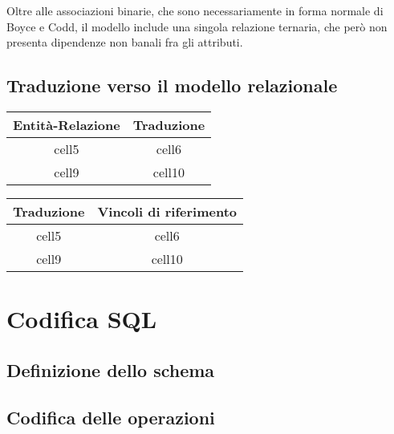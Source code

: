 \documentclass{article}
\newcommand{\sqlinputlisting}[2]{
	
}
\newcommand{\sql}[1]{
	\sqlinputlisting{../src/#1.sql}
	{\texttt{#1.sql}}
}
\begin{document}
Oltre alle associazioni binarie, che sono necessariamente in forma normale di
Boyce e Codd, il modello include una singola relazione ternaria, che però non
presenta dipendenze non banali fra gli attributi.

\subsection{Traduzione verso il modello relazionale}

\begin{center}\begin{tabular}{ |c|c| }
		\hline
		\textbf{Entità-Relazione} & \textbf{Traduzione} \\
		\hline
		cell5                     & cell6               \\
		\hline
		cell9                     & cell10              \\
		\hline
	\end{tabular}\end{center}

\begin{center}\begin{tabular}{ |c|c| }
		\hline
		\textbf{Traduzione} & \textbf{Vincoli di riferimento} \\
		\hline
		cell5               & cell6                           \\
		\hline
		cell9               & cell10                          \\
		\hline
	\end{tabular}\end{center}

\section{Codifica SQL}

\subsection{Definizione dello schema}

\sql{schema}

\subsection{Codifica delle operazioni}

\sql{operation-01}
\end{document}
